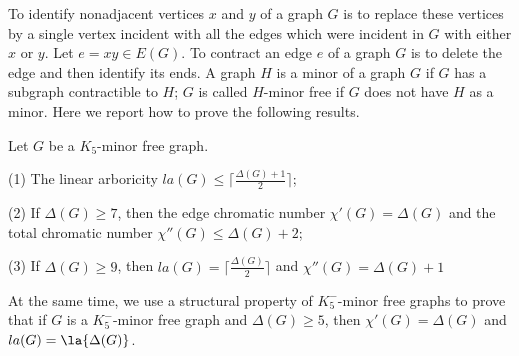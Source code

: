 
To identify nonadjacent vertices $x$ and $y$ of a graph $G$ is to replace these vertices by a single vertex incident with all the edges which were incident in $G$ with either $x$ or $y$. Let $e = xy\in E(G)$. To contract an edge $e$ of a graph $G$ is to delete the edge and then identify its ends. A graph $H$ is a minor of a graph $G$ if $G$ has a subgraph contractible to $H$; $G$ is called $H$-minor free if $G$ does not have $H$ as a minor. Here we report how to prove the following results.
\begin{theorem}  Let $G$ be a $K_5$-minor free graph.

  \item[(1)] The linear arboricity $la(G) \leq \lceil \frac{\Delta(G)+1}{2}\rceil$;
  \item[(2)] If $\Delta(G)\geq 7$, then the edge chromatic number $\chi'(G) =\Delta(G)$ and the total chromatic number $\chi''(G)\leq \Delta(G)+2$;
  \item[(3)] If $\Delta(G)\geq 9$, then $la(G) =\lceil \frac{\Delta(G)}{2}\rceil$ and $\chi''(G)= \Delta(G)+1$

\end{theorem}
At the same time, we use a structural property of $K_5^-$-minor free graphs to prove that if $G$ is a $K_5^-$-minor free graph and $\Delta (G)\geq 5$, then $\chi'(G) =\Delta(G)$ and $la(G)= \la{\Delta(G)}$.